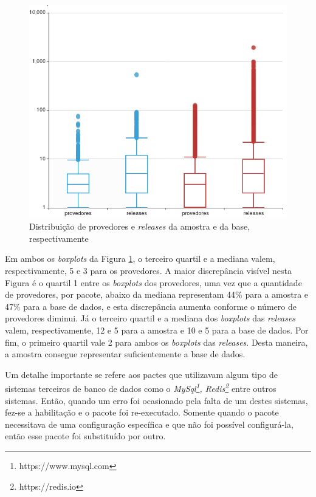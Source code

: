 \begin{figure}
    \centering
    \includegraphics[scale=0.6]{figuras/data_box_plot_pt.png}
    \caption{Distribuição de provedores e \textit{releases} da amostra e da base, respectivamente}
    \label{fig:database}
\end{figure}{}

Em ambos os \textit{boxplots} da Figura \ref{fig:database}, o terceiro quartil e a mediana valem, respectivamente, 5 e 3 para os provedores. A maior discrepância visível nesta Figura é o quartil 1 entre os \textit{boxplots} dos provedores, uma vez que a quantidade de provedores, por pacote, abaixo da mediana representam 44\% para a amostra e 47\% para a base de dados, e esta discrepância aumenta conforme o número de provedores diminui. Já o terceiro quartil e a mediana dos \textit{boxplots} das \textit{releases} valem, respectivamente, 12 e 5 para a amostra e 10 e 5 para a base de dados. Por fim, o primeiro quartil vale 2 para ambos os \textit{boxplots} das \textit{releases}. Desta maneira, a amostra consegue representar suficientemente a base de dados.

Um detalhe importante se refere aos pactes que utilizavam algum tipo de sistemas terceiros de banco de dados como o \textit{MySql\footnote{https://www.mysql.com}, Redis\footnote{https://redis.io}} entre outros sistemas. Então, quando um erro foi ocasionado pela falta de um destes sistemas, fez-se a habilitação e o pacote foi re-executado. Somente quando o pacote necessitava de uma configuração específica e que não foi possível configurá-la, então esse pacote foi substituído por outro.

